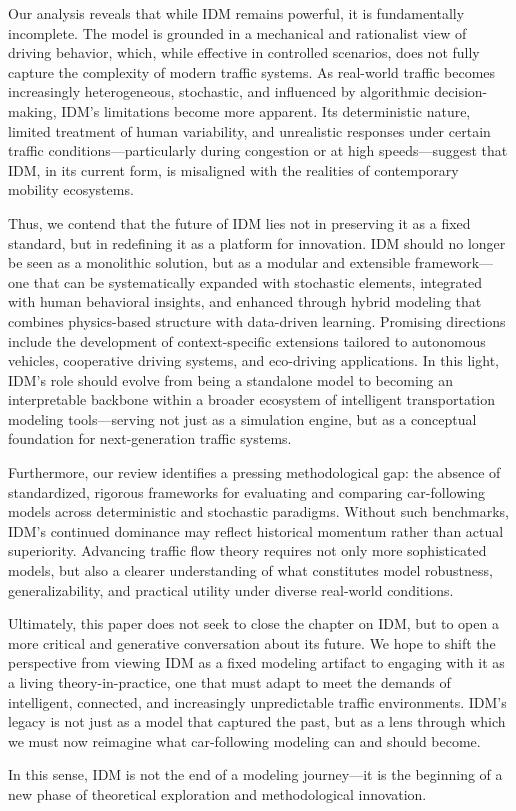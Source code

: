 \documentclass[a4paper,fleqn,11pt]{reviewresponse}
\renewenvironment{quotation}
  {\begingroup\color{customblue}%
   \captionsetup{labelfont={bf},textfont={color=customblue},font={color=customblue}}%
   \list{}{\leftmargin=0em \rightmargin=0em} %
   \item\relax\small}
  {\endlist\endgroup}
\begin{document}
\begin{quotation}
Our analysis reveals that while IDM remains powerful, it is fundamentally incomplete. The model is grounded in a mechanical and rationalist view of driving behavior, which, while effective in controlled scenarios, does not fully capture the complexity of modern traffic systems. As real-world traffic becomes increasingly heterogeneous, stochastic, and influenced by algorithmic decision-making, IDM’s limitations become more apparent. Its deterministic nature, limited treatment of human variability, and unrealistic responses under certain traffic conditions—particularly during congestion or at high speeds—suggest that IDM, in its current form, is misaligned with the realities of contemporary mobility ecosystems.

Thus, we contend that the future of IDM lies not in preserving it as a fixed standard, but in redefining it as a platform for innovation. IDM should no longer be seen as a monolithic solution, but as a modular and extensible framework—one that can be systematically expanded with stochastic elements, integrated with human behavioral insights, and enhanced through hybrid modeling that combines physics-based structure with data-driven learning. Promising directions include the development of context-specific extensions tailored to autonomous vehicles, cooperative driving systems, and eco-driving applications. In this light, IDM’s role should evolve from being a standalone model to becoming an interpretable backbone within a broader ecosystem of intelligent transportation modeling tools—serving not just as a simulation engine, but as a conceptual foundation for next-generation traffic systems.

Furthermore, our review identifies a pressing methodological gap: the absence of standardized, rigorous frameworks for evaluating and comparing car-following models across deterministic and stochastic paradigms. Without such benchmarks, IDM’s continued dominance may reflect historical momentum rather than actual superiority. Advancing traffic flow theory requires not only more sophisticated models, but also a clearer understanding of what constitutes model robustness, generalizability, and practical utility under diverse real-world conditions.

Ultimately, this paper does not seek to close the chapter on IDM, but to open a more critical and generative conversation about its future. We hope to shift the perspective from viewing IDM as a fixed modeling artifact to engaging with it as a living theory-in-practice, one that must adapt to meet the demands of intelligent, connected, and increasingly unpredictable traffic environments. IDM’s legacy is not just as a model that captured the past, but as a lens through which we must now reimagine what car-following modeling can and should become.

In this sense, IDM is not the end of a modeling journey—it is the beginning of a new phase of theoretical exploration and methodological innovation.
    
\end{quotation}
\end{document}
